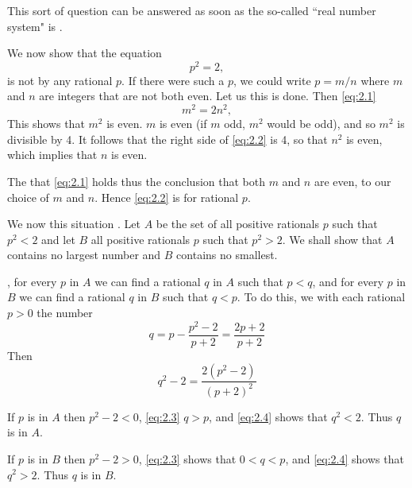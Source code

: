 This sort of question can be answered as soon as the so-called ``real number system" is .
\begin{theorem}
  We now show that the equation
  \begin{equation}\label{eq:2.1}
    p^2 = 2,
  \end{equation}
  is not  by any rational $p$. If there were such a $p$, we could write $p=m / n$ where $m$ and $n$ are integers that are not both even. Let us  this is done. Then \eqref{eq:2.1} 
  \begin{equation}\label{eq:2.2}
    m^2 = 2n^2,
  \end{equation}
  This shows that $m^2$ is even.  $m$ is even (if $m$  odd, $m^2$ would be odd), and so $m^2$ is divisible by 4. It follows that the right side of \eqref{eq:2.2} is  4, so that $n^2$ is even, which implies that $n$ is even.

  The  that \eqref{eq:2.1} holds thus  the conclusion that both $m$ and $n$ are even,  to our choice of $m$ and $n$. Hence \eqref{eq:2.2} is  for rational $p$.

  We now  this situation . Let $A$ be the set of all positive rationals $p$ such that $p^2<2$ and let $B$  all positive rationals $p$ such that $p^2>2$. We shall show that $A$ contains no largest number and $B$ contains no smallest.

  , for every $p$ in $A$ we can find a rational $q$ in $A$ such that $p<q$, and for every $p$ in $B$ we can find a rational $q$ in $B$ such that $q<p$. To do this, we  with each rational $p>0$ the number
  \begin{equation}\label{eq:2.3}
    q=p-\frac{p^2-2}{p+2}=\frac{2 p+2}{p+2}
  \end{equation}
  Then
  \begin{equation}\label{eq:2.4}
    q^2-2=\frac{2\left(p^2-2\right)}{(p+2)^2}
  \end{equation}
  
  If $p$ is in $A$ then $p^2-2<0$, \eqref{eq:2.3}  $q>p$, and \eqref{eq:2.4} shows that $q^2<2$. Thus $q$ is in $A$.

  If $p$ is in $B$ then $p^2-2>0$, \eqref{eq:2.3} shows that $0<q<p$, and \eqref{eq:2.4} shows that $q^2>2$. Thus $q$ is in $B$.
\end{theorem}

